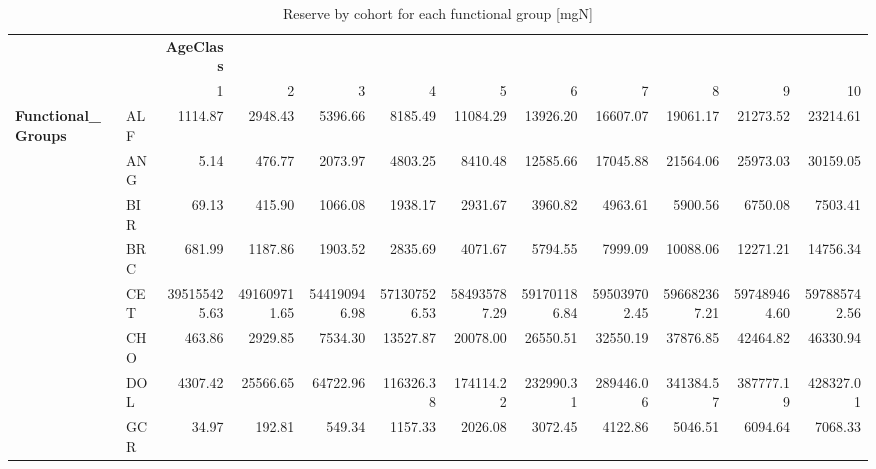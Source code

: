 \documentclass[11pt]{article}
\begin{document}
\begin{table}[htb]
\caption{Reserve by cohort for each functional group [mgN]}
\begin{center}
\begin{tabular}{llrrrrrrrrrr}
                             &       &  \textbf{AgeClass}  &                &                &                &                &                &                &                &                &                \\
                             &       &                  1  &             2  &             3  &             4  &             5  &             6  &             7  &             8  &             9  &            10  \\
\hline
 \textbf{Functional_Groups}  &  ALF  &            1114.87  &       2948.43  &       5396.66  &       8185.49  &      11084.29  &      13926.20  &      16607.07  &      19061.17  &      21273.52  &      23214.61  \\
                             &  ANG  &               5.14  &        476.77  &       2073.97  &       4803.25  &       8410.48  &      12585.66  &      17045.88  &      21564.06  &      25973.03  &      30159.05  \\
                             &  BIR  &              69.13  &        415.90  &       1066.08  &       1938.17  &       2931.67  &       3960.82  &       4963.61  &       5900.56  &       6750.08  &       7503.41  \\
                             &  BRC  &             681.99  &       1187.86  &       1903.52  &       2835.69  &       4071.67  &       5794.55  &       7999.09  &      10088.06  &      12271.21  &      14756.34  \\
                             &  CET  &       395155425.63  &  491609711.65  &  544190946.98  &  571307526.53  &  584935787.29  &  591701186.84  &  595039702.45  &  596682367.21  &  597489464.60  &  597885742.56  \\
                             &  CHO  &             463.86  &       2929.85  &       7534.30  &      13527.87  &      20078.00  &      26550.51  &      32550.19  &      37876.85  &      42464.82  &      46330.94  \\
                             &  DOL  &            4307.42  &      25566.65  &      64722.96  &     116326.38  &     174114.22  &     232990.31  &     289446.06  &     341384.57  &     387777.19  &     428327.01  \\
                             &  GCR  &              34.97  &        192.81  &        549.34  &       1157.33  &       2026.08  &       3072.45  &       4122.86  &       5046.51  &       6094.64  &       7068.33  \\

\end{tabular}
\end{center}
\end{table}
\end{document}
